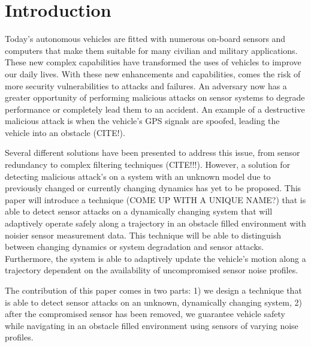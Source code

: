 
\section{Introduction} \label{sec:introduction}

Today's autonomous vehicles are fitted with numerous on-board sensors and computers that make them suitable for many civilian and military applications. These new complex capabilities have transformed the uses of vehicles to improve our daily lives. With these new enhancements and capabilities, comes the risk of more security vulnerabilities to attacks and failures. An adversary now has a greater opportunity of performing malicious attacks on sensor systems to degrade performance or completely lead them to an accident. An example of a destructive malicious attack is when the vehicle's GPS signals are spoofed, leading the vehicle into an obstacle (CITE!).

Several different solutions have been presented to address this issue, from sensor redundancy to complex filtering techniques (CITE!!!). However, a solution for detecting malicious attack's on a system with an unknown model due to previously changed or currently changing dynamics has yet to be proposed. This paper will introduce a technique (COME UP WITH A UNIQUE NAME?) that is able to detect sensor attacks on a dynamically changing system that will adaptively operate safely along a trajectory in an obstacle filled environment with noisier sensor measurement data. This technique will be able to distinguish between changing dynamics or system degradation and sensor attacks. Furthermore, the system is able to adaptively update the vehicle's motion along a trajectory dependent on the availability of uncompromised sensor noise profiles.

The contribution of this paper comes in two parts: 1) we design a technique that is able to detect sensor attacks on an unknown, dynamically changing system, 2) after the compromised sensor has been removed, we guarantee vehicle safety while navigating in an obstacle filled environment using sensors of varying noise profiles.





